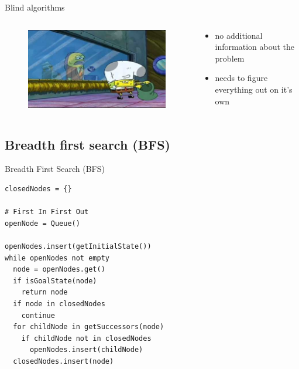 \documentclass{beamer}
\begin{document}
\begin{frame}{Blind algorithms}

	\begin{columns}[T]
	
		\begin{column}{.48\textwidth}
			\begin{figure}
			\centering
				\includegraphics[width=\linewidth]{spongebob_blind.jpg}
			\end{figure}
		\end{column}
		
		\begin{column}{.48\textwidth}
		
			\begin{itemize}
				\item no additional information about the problem
				\item needs to figure everything out on it's own
			\end{itemize}
		
		\end{column}
	
	\end{columns}

\end{frame}

\subsection{Breadth first search (BFS)}

\begin{frame}[fragile]{Breadth First Search (BFS)}
	\begin{lstlisting}
closedNodes = {}

# First In First Out
openNode = Queue()

openNodes.insert(getInitialState())
while openNodes not empty 
  node = openNodes.get()
  if isGoalState(node)
    return node
  if node in closedNodes
    continue				
  for childNode in getSuccessors(node)
    if childNode not in closedNodes
      openNodes.insert(childNode)
  closedNodes.insert(node)
	\end{lstlisting}
\end{frame}
\end{document}
